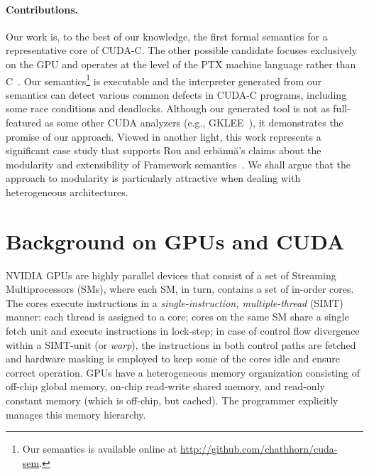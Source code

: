 \paragraph{Contributions.}
Our work is, to the best of our knowledge, the first formal semantics for a
representative core of CUDA-C. The other possible candidate focuses exclusively
on the GPU and operates at the level of the PTX machine language rather than
C~\cite{habermaier:tr11}. Our semantics\footnote{Our semantics is available
online at \url{http://github.com/chathhorn/cuda-sem}.} is executable and the
interpreter generated from our semantics can detect various common defects in
CUDA-C programs, including some race conditions and deadlocks. 
Although our generated tool is not as full-featured as some other CUDA analyzers
(e.g., GKLEE~\cite{li:ppopp12}), it demonstrates the promise of our approach.
Viewed in another light, this work represents a significant case study that
supports Rou and erb\u{a}nu\u{a}'s claims about the modularity
and extensibility of \K Framework semantics~\cite{rosu:jlap10}. We shall argue
that the \K approach to modularity is particularly attractive when dealing with
heterogeneous architectures.

\section{Background on GPUs and CUDA}

NVIDIA GPUs are highly parallel devices that consist of a set of Streaming
Multiprocessors (SMs), where each SM, in turn, contains a set of in-order cores.
The cores execute instructions in a {\em single-instruction, multiple-thread}
(SIMT) manner: each thread is assigned to a core; cores on the same SM share a
single fetch unit and execute instructions in lock-step; in case of control flow
divergence within a SIMT-unit (or {\em warp}), the instructions in both control
paths are fetched and hardware masking is employed to keep some of the cores
idle and ensure correct operation. 
GPUs have a heterogeneous memory organization consisting of off-chip global
memory, on-chip read-write shared memory, and read-only constant memory (which
is off-chip, but cached). 
The programmer explicitly manages this memory hierarchy. 


